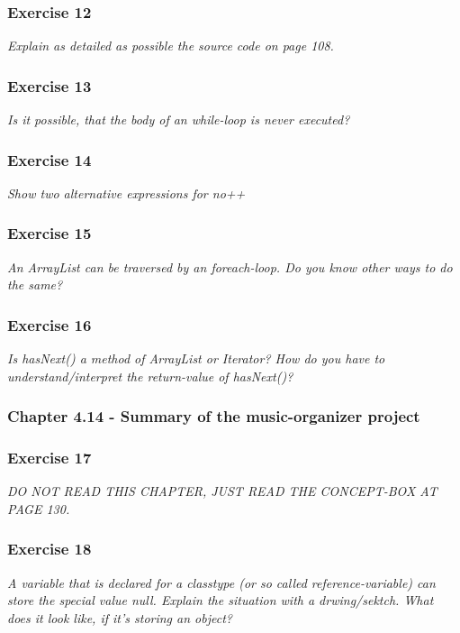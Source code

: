 \subsubsection*{Exercise 12}
\textit{Explain as detailed as possible the source code on page 108.}\\

\subsubsection*{Exercise 13}
\textit{Is it possible, that the body of an while-loop is never executed?}\\

\subsubsection*{Exercise 14}
\textit{Show two alternative expressions for no++}\\

\subsubsection*{Exercise 15}
\textit{An ArrayList can be traversed by an foreach-loop. Do you know other
ways to do the same?}\\

\subsubsection*{Exercise 16}
\textit{Is hasNext() a method of ArrayList or Iterator? How do you have to 
understand/interpret the return-value of hasNext()?}\\

\subsubsection{Chapter 4.14 - Summary of the music-organizer project}

\subsubsection*{Exercise 17}
\textit{DO NOT READ THIS CHAPTER, JUST READ THE CONCEPT-BOX AT PAGE 130.}\\

\subsubsection*{Exercise 18}
\textit{A variable that is declared for a classtype (or so called 
reference-variable) can store the special value null. Explain the situation 
with a drwing/sektch. What does it look like, if it's storing an object?}\\

